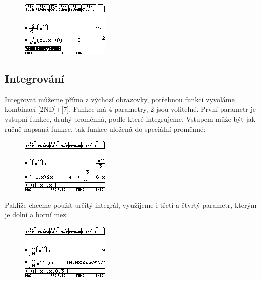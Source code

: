 \documentclass[10pt,a4paper,float]{article}
\begin{document}
\begin{figure}[H]
	\centering
	\includegraphics[width=.5\textwidth]{img/DERIVACE}
\end{figure}

\pagebreak

\subsection{Integrování}
Integrovat můžeme přímo z výchozí obrazovky, potřebnou funkci vyvoláme kombinací [2ND]+[7]. Funkce má 4 parametry, 2 jsou volitelné. První parametr je vstupní funkce, druhý proměnná, podle které integrujeme. Vstupem může být jak ručně napsaná funkce, tak funkce uložená do speciální proměnné:

\begin{figure}[H]
	\centering
	\includegraphics[width=.5\textwidth]{img/INTEGROVANI1}
\end{figure}

Pakliže chceme použít určitý integrál, využijeme i třetí a čtvrtý parametr, kterým je dolní a horní mez:

\begin{figure}[H]
	\centering
	\includegraphics[width=.5\textwidth]{img/INTEGROVANI2}
\end{figure}
\end{document}

